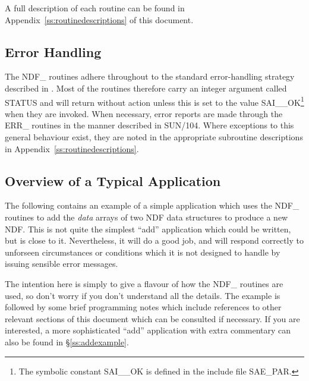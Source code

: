 \documentclass[twoside,11pt,nolof]{starlink}
\providecommand{\st}[1]{{\emph{#1}}}
\begin{document}
A full description of each routine can be found in
Appendix~\ref{ss:routinedescriptions} of this document.

\subsection{\label{ss:errorhandling}Error Handling}

The NDF\_ routines adhere throughout to the standard error-handling
strategy described in .  Most of the
routines therefore carry an integer  argument called STATUS and will
return without action unless this is set to the value
SAI\_\_OK\footnote{The symbolic constant SAI\_\_OK is defined in the
include file SAE\_PAR.} when they are invoked.  When necessary, error
reports are made through the ERR\_ routines in the manner described in
SUN/104.  Where exceptions to this general behaviour exist, they are
noted in the appropriate subroutine descriptions in
Appendix~\ref{ss:routinedescriptions}.

\subsection{\label{ss:applicationoverview}Overview of a Typical Application}

The following contains an example of a simple application which uses the
NDF\_ routines to add the \st{data\/} arrays of two NDF data structures to
produce a new NDF.
This is not quite the simplest ``add'' application which could be written,
but is close to it.
Nevertheless, it will do a good job, and will respond correctly to unforseen
circumstances or conditions which it is not designed to handle by issuing
sensible error messages.

The intention here is simply to give a flavour of how the NDF\_ routines are
used, so don't worry if you don't understand all the details.
The example is followed by some brief programming notes which include
references to other relevant sections of this document which can be
consulted if necessary.
If you are interested, a more sophisticated ``add'' application with extra
commentary can also be found in \S\ref{ss:addexample}.
\end{document}
